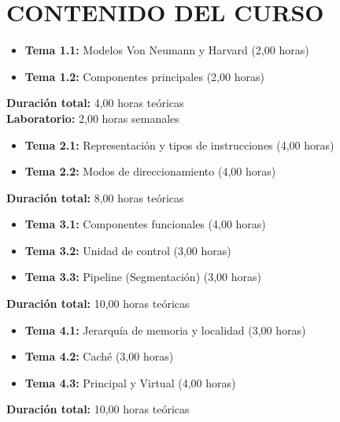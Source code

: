 \documentclass[12pt,a4paper]{article}
\begin{document}
\section{CONTENIDO DEL CURSO}

\begin{tcolorbox}[colback=white,colframe=pucpAzul,title=\textbf{UNIDAD 1: Introducción a la Arquitectura de Computadoras}]
\begin{itemize}[leftmargin=*]
    \item \textbf{Tema 1.1:} Modelos Von Neumann y Harvard (2,00 horas)
    \item \textbf{Tema 1.2:} Componentes principales (2,00 horas)
\end{itemize}
\textbf{Duración total:} 4,00 horas teóricas \\
\textbf{Laboratorio:} 2,00 horas semanales
\end{tcolorbox}

\begin{tcolorbox}[colback=white,colframe=pucpAzul,title=\textbf{UNIDAD 2: Instrucciones}]
\begin{itemize}[leftmargin=*]
    \item \textbf{Tema 2.1:} Representación y tipos de instrucciones (4,00 horas)
    \item \textbf{Tema 2.2:} Modos de direccionamiento (4,00 horas)
\end{itemize}
\textbf{Duración total:} 8,00 horas teóricas
\end{tcolorbox}

\begin{tcolorbox}[colback=white,colframe=pucpAzul,title=\textbf{UNIDAD 3: CPU (Unidad Central de Procesamiento)}]
\begin{itemize}[leftmargin=*]
    \item \textbf{Tema 3.1:} Componentes funcionales (4,00 horas)
    \item \textbf{Tema 3.2:} Unidad de control (3,00 horas)
    \item \textbf{Tema 3.3:} Pipeline (Segmentación) (3,00 horas)
\end{itemize}
\textbf{Duración total:} 10,00 horas teóricas
\end{tcolorbox}

\begin{tcolorbox}[colback=white,colframe=pucpAzul,title=\textbf{UNIDAD 4: Memoria}]
\begin{itemize}[leftmargin=*]
    \item \textbf{Tema 4.1:} Jerarquía de memoria y localidad (3,00 horas)
    \item \textbf{Tema 4.2:} Caché (3,00 horas)
    \item \textbf{Tema 4.3:} Principal y Virtual (4,00 horas)
\end{itemize}
\textbf{Duración total:} 10,00 horas teóricas
\end{tcolorbox}
\end{document}

